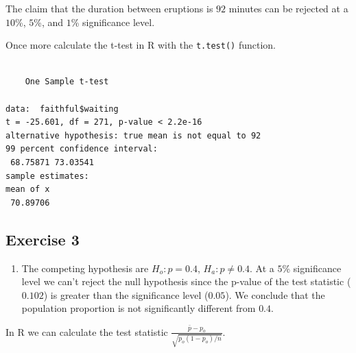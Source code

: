 \documentclass[
  letterpaper,
  DIV=11,
  numbers=noendperiod]{scrreprt}
\newenvironment{Shaded}{\begin{snugshade}}{\end{snugshade}}
\newcommand{\AttributeTok}[1]{\textcolor[rgb]{0.40,0.45,0.13}{#1}}
\newcommand{\DecValTok}[1]{\textcolor[rgb]{0.68,0.00,0.00}{#1}}
\newcommand{\FloatTok}[1]{\textcolor[rgb]{0.68,0.00,0.00}{#1}}
\newcommand{\FunctionTok}[1]{\textcolor[rgb]{0.28,0.35,0.67}{#1}}
\newcommand{\NormalTok}[1]{\textcolor[rgb]{0.00,0.23,0.31}{#1}}
\newcommand{\SpecialCharTok}[1]{\textcolor[rgb]{0.37,0.37,0.37}{#1}}
\newcommand{\StringTok}[1]{\textcolor[rgb]{0.13,0.47,0.30}{#1}}
\providecommand{\tightlist}{%
  \setlength{\itemsep}{0pt}\setlength{\parskip}{0pt}}\usepackage{longtable,booktabs,array}
\begin{document}
\begin{blackbox}
The claim that the duration between eruptions is \(92\) minutes can be
rejected at a \(10\)\%, \(5\)\%, and \(1\)\% significance level.

\end{blackbox}

Once more calculate the t-test in R with the \texttt{t.test()} function.

\begin{Shaded}
\end{Shaded}

\begin{verbatim}

    One Sample t-test

data:  faithful$waiting
t = -25.601, df = 271, p-value < 2.2e-16
alternative hypothesis: true mean is not equal to 92
99 percent confidence interval:
 68.75871 73.03541
sample estimates:
mean of x 
 70.89706 
\end{verbatim}

\hypertarget{exercise-3-25}{%
\subsection*{Exercise 3}\label{exercise-3-25}}

\begin{blackbox}

\begin{enumerate}
\def\labelenumi{\arabic{enumi}.}
\tightlist
\item
  The competing hypothesis are \(H_{o}: p = 0.4\),
  \(H_{a}: p \neq 0.4\). At a \(5\)\% significance level we can't reject
  the null hypothesis since the p-value of the test statistic
  (\(0.102\)) is greater than the significance level (\(0.05\)). We
  conclude that the population proportion is not significantly different
  from \(0.4\).
\end{enumerate}

\end{blackbox}

In R we can calculate the test statistic
\(\frac {\bar{p}-p_{o}}{\sqrt {p_{o}(1-p_{o})/n}}\).
\end{document}
